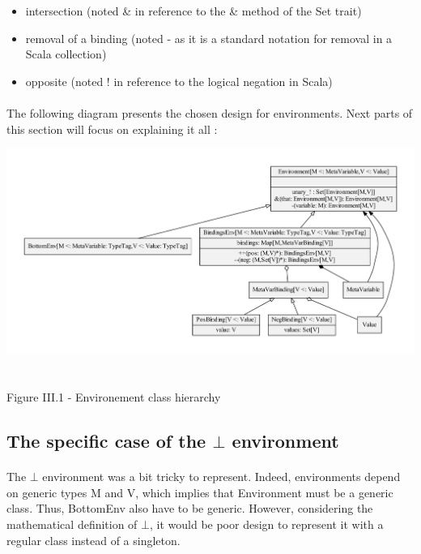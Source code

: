 \documentclass{report}
\begin{document}
\vspace{1.5mm}
\begin{itemize}
\item intersection (noted \& in reference to the \& method of the Set trait)\vspace{1mm}
\item removal of a binding (noted - as it is a standard notation for removal in a Scala collection)\vspace{1mm}
\item opposite (noted ! in reference to the logical negation in Scala)\vspace{1mm}
\end{itemize}

\paragraph{}
\hspace{4mm}The following diagram presents the chosen design for environments. Next parts of this section will focus on explaining it all :

\begin{center}
\includegraphics[scale=0.5]{data/Env}
~\\~\\Figure III.1 - Environement class hierarchy
\end{center}

\subsection{The specific case of the $\bot$ environment}

\paragraph{}
\hspace{4mm}The $\bot$ environment was a bit tricky to represent. Indeed, environments depend on generic types
M and V, which implies that Environment must be a generic class. Thus, BottomEnv also have to be generic. However, 
considering the mathematical definition of $\bot$, it would be poor design to represent it with a regular class instead of a singleton.
\end{document}
